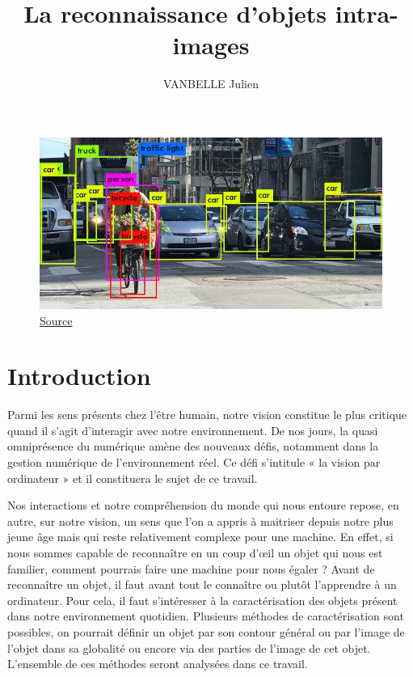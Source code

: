 \documentclass[a4paper,12pt]{article} %
\title{\textbf{La reconnaissance d'objets intra-images}} %
\author{VANBELLE Julien} %
\date{} %
\begin{document}
\maketitle %

\begin{figure}[h] %
  \centering %
  \includegraphics[scale=0.5]{illu1.jpg} %
  \caption{\href{https://www.datagenius.fr/post/reconnaissance-d-image-intelligence-artificielle-ai-compare}{Source}} %
\end{figure}
\vspace{30pt}
\tableofcontents
\newpage
\section{Introduction} %
		Parmi les sens présents chez l'être humain, notre vision constitue le plus critique quand il s'agit d'interagir avec notre environnement. De nos jours, la quasi omniprésence du numérique amène des nouveaux défis, notamment dans la gestion numérique de l’environnement réel. Ce défi s’intitule « la vision par ordinateur » et il constituera le sujet de ce travail. \newline

	Nos interactions et notre compréhension du monde qui nous entoure repose, en autre, sur notre vision, un sens que l’on a appris à maitriser depuis notre plus jeune âge mais qui reste relativement complexe pour une machine. En effet, si nous sommes capable de reconnaître en un coup d’œil un objet qui nous est familier, comment pourrais faire une machine pour nous égaler ? 
Avant de reconnaître un objet, il faut avant tout le connaître ou plutôt l’apprendre à un ordinateur. Pour cela, il faut s’intéresser à la caractérisation des objets présent dans notre environnement quotidien.  Plusieurs méthodes de caractérisation sont possibles, on pourrait définir un objet par son contour général ou par l’image de l’objet dans sa globalité ou encore via des parties de l’image de cet objet. L’ensemble de ces méthodes seront analysées dans ce travail. \newline
\end{document}
